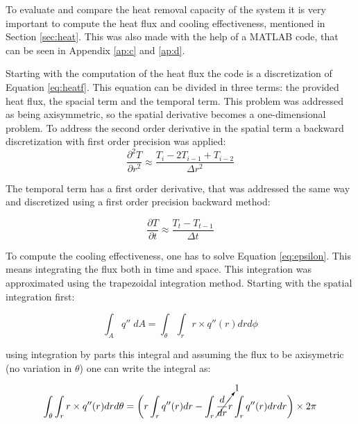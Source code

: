 \par To evaluate and compare the heat removal capacity of the system it is very important to compute the heat flux and cooling effectiveness, mentioned in Section \ref{sec:heat}. This was also made with the help of a MATLAB code, that can be seen in Appendix \ref{ap:c} and \ref{ap:d}.\\
\par Starting with the computation of the heat flux the code is a discretization of Equation \ref{eq:heatf}. This equation can be divided in three terms: the provided heat flux, the spacial term and the temporal term. This problem was addressed as being axisymmetric, so the spatial derivative becomes a one-dimensional problem. To address the second order derivative in the spatial term a backward discretization with first order precision was applied:\\
\begin{equation}
\frac{{\partial}^2 T}{\partial r^2} \approx \frac{T_i-2T_{i-1}+T_{i-2}}{\Delta r^2}
\end{equation}

\par The temporal term has a first order derivative, that was addressed the same way and discretized using a first order precision backward method:

\begin{equation}
\frac{{\partial} T}{\partial t} \approx \frac{T_t-T_{t-1}}{\Delta t}
\end{equation}

\par To compute the cooling effectiveness, one has to solve Equation \ref{eq:epsilon}. This means integrating the flux both in time and space. This integration was approximated using the trapezoidal integration method. Starting with the spatial integration first:

\begin{equation}
\int_A q'' \; dA = \int_\theta \int_r r \times q''(r) dr d\phi
\end{equation}

using integration by parts this integral and assuming the flux to be axisymetric (no variation in $\theta$) one can write the integral as:

\begin{equation}
\int_\theta \int_r r \times q''(r) dr d\theta = \bigg( r \int_r q''(r) dr - \int_r \cancelto{1}{\frac{d}{dr}r} \int_r q''(r) dr dr \bigg) \times 2 \pi
\end{equation}

